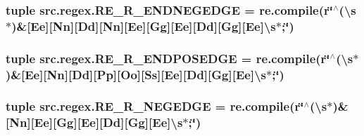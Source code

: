 \hypertarget{namespacesrc_1_1regex_afad9cf9ad3473c5ad876f42d5f85a972}{
\subsubsection[{R\-E\-\_\-\-R\-\_\-\-E\-N\-D\-N\-E\-G\-E\-D\-G\-E}]{\setlength{\rightskip}{0pt plus 5cm}tuple src.\-regex.\-R\-E\-\_\-\-R\-\_\-\-E\-N\-D\-N\-E\-G\-E\-D\-G\-E = re.\-compile(r\char`\"{}$^\wedge$(\textbackslash{}s$\ast$)\&\mbox{[}Ee\mbox{]}\mbox{[}Nn\mbox{]}\mbox{[}Dd\mbox{]}\mbox{[}Nn\mbox{]}\mbox{[}Ee\mbox{]}\mbox{[}Gg\mbox{]}\mbox{[}Ee\mbox{]}\mbox{[}Dd\mbox{]}\mbox{[}Gg\mbox{]}\mbox{[}Ee\mbox{]}\textbackslash{}s$\ast$;\char`\"{})}}\label{namespacesrc_1_1regex_afad9cf9ad3473c5ad876f42d5f85a972}
\hypertarget{namespacesrc_1_1regex_a105e748334ac043df88e38efd47f4e61}{
\subsubsection[{R\-E\-\_\-\-R\-\_\-\-E\-N\-D\-P\-O\-S\-E\-D\-G\-E}]{\setlength{\rightskip}{0pt plus 5cm}tuple src.\-regex.\-R\-E\-\_\-\-R\-\_\-\-E\-N\-D\-P\-O\-S\-E\-D\-G\-E = re.\-compile(r\char`\"{}$^\wedge$(\textbackslash{}s$\ast$)\&\mbox{[}Ee\mbox{]}\mbox{[}Nn\mbox{]}\mbox{[}Dd\mbox{]}\mbox{[}Pp\mbox{]}\mbox{[}Oo\mbox{]}\mbox{[}Ss\mbox{]}\mbox{[}Ee\mbox{]}\mbox{[}Dd\mbox{]}\mbox{[}Gg\mbox{]}\mbox{[}Ee\mbox{]}\textbackslash{}s$\ast$;\char`\"{})}}\label{namespacesrc_1_1regex_a105e748334ac043df88e38efd47f4e61}
\hypertarget{namespacesrc_1_1regex_a861682891ae7bb4bab8cfef6a3274606}{
\subsubsection[{R\-E\-\_\-\-R\-\_\-\-N\-E\-G\-E\-D\-G\-E}]{\setlength{\rightskip}{0pt plus 5cm}tuple src.\-regex.\-R\-E\-\_\-\-R\-\_\-\-N\-E\-G\-E\-D\-G\-E = re.\-compile(r\char`\"{}$^\wedge$(\textbackslash{}s$\ast$)\&\mbox{[}Nn\mbox{]}\mbox{[}Ee\mbox{]}\mbox{[}Gg\mbox{]}\mbox{[}Ee\mbox{]}\mbox{[}Dd\mbox{]}\mbox{[}Gg\mbox{]}\mbox{[}Ee\mbox{]}\textbackslash{}s$\ast$;\char`\"{})}}\label{namespacesrc_1_1regex_a861682891ae7bb4bab8cfef6a3274606}
